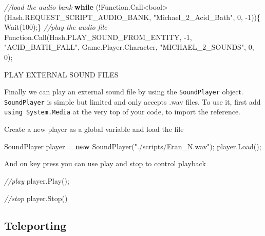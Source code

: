 \documentclass[
  openany]{book}
\newenvironment{Shaded}{\begin{snugshade}}{\end{snugshade}}
\newcommand{\CommentTok}[1]{\textcolor[rgb]{0.56,0.35,0.01}{\textit{#1}}}
\newcommand{\DataTypeTok}[1]{\textcolor[rgb]{0.13,0.29,0.53}{#1}}
\newcommand{\DecValTok}[1]{\textcolor[rgb]{0.00,0.00,0.81}{#1}}
\newcommand{\FunctionTok}[1]{\textcolor[rgb]{0.00,0.00,0.00}{#1}}
\newcommand{\KeywordTok}[1]{\textcolor[rgb]{0.13,0.29,0.53}{\textbf{#1}}}
\newcommand{\NormalTok}[1]{#1}
\newcommand{\StringTok}[1]{\textcolor[rgb]{0.31,0.60,0.02}{#1}}
\begin{document}
\begin{Shaded}
\begin{Highlighting}[]
\CommentTok{//load the audio bank}
\KeywordTok{while}\NormalTok{ (!Function.}\FunctionTok{Call}\NormalTok{<}\DataTypeTok{bool}\NormalTok{>(Hash.}\FunctionTok{REQUEST_SCRIPT_AUDIO_BANK}\NormalTok{, }\StringTok{"Michael_2_Acid_Bath"}\NormalTok{, }\DecValTok{0}\NormalTok{, }\DecValTok{-1}\NormalTok{))\{ }\FunctionTok{Wait}\NormalTok{(}\DecValTok{100}\NormalTok{);\}            }
\CommentTok{//play the audio file}
\NormalTok{Function.}\FunctionTok{Call}\NormalTok{(Hash.}\FunctionTok{PLAY_SOUND_FROM_ENTITY}\NormalTok{, }\DecValTok{-1}\NormalTok{, }\StringTok{"ACID_BATH_FALL"}\NormalTok{, Game.}\FunctionTok{Player}\NormalTok{.}\FunctionTok{Character}\NormalTok{, }\StringTok{"MICHAEL_2_SOUNDS"}\NormalTok{, }\DecValTok{0}\NormalTok{, }\DecValTok{0}\NormalTok{);}
\end{Highlighting}
\end{Shaded}

PLAY EXTERNAL SOUND FILES

Finally we can play an external sound file by using the \texttt{SoundPlayer} object. \texttt{SoundPlayer} is simple but limited and only accepts .wav files. To use it, first add \texttt{using\ System.Media} at the very top of your code, to import the reference.

Create a new player as a global variable and load the file

\begin{Shaded}
\begin{Highlighting}[]
\NormalTok{SoundPlayer player = }\KeywordTok{new} \FunctionTok{SoundPlayer}\NormalTok{(}\StringTok{"./scripts/Eran_N.wav"}\NormalTok{);}
\NormalTok{player.}\FunctionTok{Load}\NormalTok{();}
\end{Highlighting}
\end{Shaded}

And on key press you can use play and stop to control playback

\begin{Shaded}
\begin{Highlighting}[]
\CommentTok{//play}
\NormalTok{player.}\FunctionTok{Play}\NormalTok{();}

\CommentTok{//stop}
\NormalTok{player.}\FunctionTok{Stop}\NormalTok{()}
\end{Highlighting}
\end{Shaded}

\hypertarget{teleporting}{%
\subsection*{Teleporting}\label{teleporting}}
\end{document}
